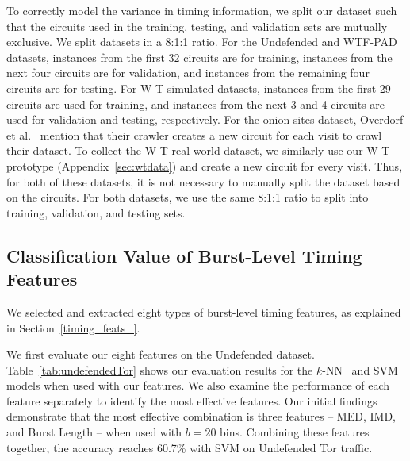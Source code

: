 \documentclass[USenglish,oneside,twocolumn]{article}
\begin{document}
To correctly model the variance in timing information, we split our dataset such that the circuits used in the training, testing, and validation sets are mutually exclusive. 
We split datasets in a 8:1:1 ratio. For the Undefended and WTF-PAD datasets, instances from the first 32 circuits are for training, instances from the next four circuits 
are for validation, and instances from the remaining four circuits 
are for testing. For W-T simulated datasets, instances from the first 29 circuits are used for training, and instances from the next 3 and 4 circuits are used for validation and testing, respectively. For the onion sites dataset, Overdorf et al.~\cite{overdorf2017unique} mention that their crawler creates a new circuit for each visit to crawl their dataset. To collect the W-T real-world dataset, we similarly use our W-T prototype (Appendix~\ref{sec:wtdata}) and create a new circuit for every visit. Thus, for both of these datasets, it is not necessary to manually split the dataset based on the circuits. For both datasets, we use the same 8:1:1 ratio to split into training, validation, and testing sets. 








\subsection{Classification Value of Burst-Level Timing Features}
\label{subsec:combiningtiming}



We selected and extracted eight types of burst-level timing features, as explained in Section~\ref{timing_feats_}.



We first evaluate our eight features on the Undefended dataset. Table~\ref{tab:undefendedTor} shows our evaluation results for the $k$-NN~\cite{wang2014effective} and SVM~\cite{panchenko2016website} models when used with our features. We also examine the performance of each feature separately to identify the most effective features.
Our initial findings demonstrate that the most effective combination is three features -- MED, IMD, and Burst Length -- when used with $b=20$ bins.
Combining these features together, the accuracy reaches 60.7\% with SVM on Undefended Tor traffic. 
\end{document}
